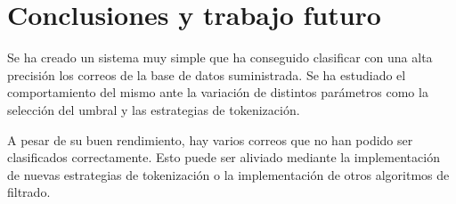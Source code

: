 \section{Conclusiones y trabajo futuro}

Se ha creado un sistema muy simple que ha conseguido clasificar con una alta
precisión los correos de la base de datos suministrada. Se ha estudiado el
comportamiento del mismo ante la variación de distintos parámetros como la
selección del umbral y las estrategias de tokenización.

A pesar de su buen rendimiento, hay varios correos que no han podido ser
clasificados correctamente. Esto puede ser aliviado mediante la implementación
de nuevas estrategias de tokenización o la implementación de otros algoritmos de
filtrado.

